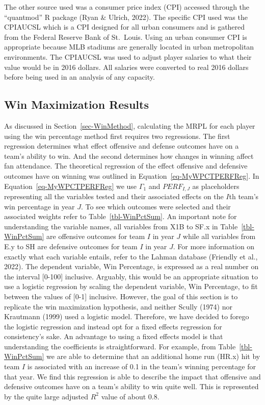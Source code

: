 \documentclass[
  12pt,
  letterpaper,
  DIV=11,
  numbers=noendperiod]{scrartcl}
\begin{document}
The other source used was a consumer price index (CPI) accessed through
the ``quantmod'' R package (Ryan \& Ulrich, 2022). The specific CPI used
was the CPIAUCSL which is a CPI designed for all urban consumers and is
gathered from the Federal Reserve Bank of St.~Louis. Using an urban
consumer CPI is appropriate because MLB stadiums are generally located
in urban metropolitan environments. The CPIAUCSL was used to adjust
player salaries to what their value would be in 2016 dollars. All
salaries were converted to real 2016 dollars before being used in an
analysis of any capacity.

\hypertarget{sec-WinMaximizationResults}{%
\subsection{Win Maximization Results}\label{sec-WinMaximizationResults}}

As discussed in Section~\ref{sec-WinMethod}, calculating the MRPL for
each player using the win percentage method first requires two
regressions. The first regression determines what effect offensive and
defense outcomes have on a team's ability to win. And the second
determines how changes in winning affect fan attendance. The theoretical
regression of the effect offensive and defensive outcomes have on
winning was outlined in Equation~\ref{eq-MyWPCTPERFReg}. In
Equation~\ref{eq-MyWPCTPERFReg} we use \(\Gamma_1\) and \(PERF_{I,J}\)
as placeholders representing all the variables tested and their
associated effects on the \(I\)th team's win percentage in year \(J\).
To see which outcomes were selected and their associated weights refer
to Table~\ref{tbl-WinPctSum}. An important note for understanding the
variable names, all variables from X1B to SF.x in
Table~\ref{tbl-WinPctSum} are offensive outcomes for team \(I\) in year
\(J\) while all variables from E.y to SH are defensive outcomes for team
\(I\) in year \(J\). For more information on exactly what each variable
entails, refer to the Lahman database (Friendly et al., 2022). The
dependent variable, Win Percentage, is expressed as a real number on the
interval {[}0-100{]} inclusive. Arguably, this would be an appropriate
situation to use a logistic regression by scaling the dependent
variable, Win Percentage, to fit between the values of {[}0-1{]}
inclusive. However, the goal of this section is to replicate the win
maximization hypothesis, and neither Scully (1974) nor Krautmann (1999)
used a logistic model. Therefore, we have decided to forego the logistic
regression and instead opt for a fixed effects regression for
consistency's sake. An advantage to using a fixed effects model is that
understanding the coefficients is straightforward. For example, from
Table~\ref{tbl-WinPctSum} we are able to determine that an additional
home run (HR.x) hit by team \(I\) is associated with an increase of 0.1
in the team's winning percentage for that year. We find this regression
is able to describe the impact that offensive and defensive outcomes
have on a team's ability to win quite well. This is represented by the
quite large adjusted \(R^2\) value of about 0.8.
\end{document}
